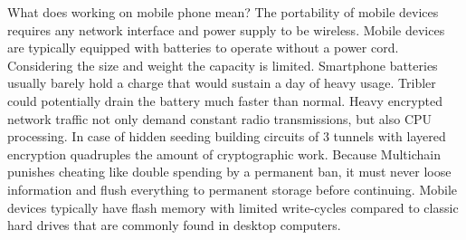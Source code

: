 What does working on mobile phone mean?
The portability of mobile devices requires any network interface and power supply to be wireless.
Mobile devices are typically equipped with batteries to operate without a power cord.
Considering the size and weight the capacity is limited.
Smartphone batteries usually barely hold a charge that would sustain a day of heavy usage.
Tribler could potentially drain the battery much faster than normal.
Heavy encrypted network traffic not only demand constant radio transmissions, but also CPU processing.
In case of hidden seeding building circuits of 3 tunnels with layered encryption quadruples  the amount of cryptographic work.
Because Multichain punishes cheating like double spending by a permanent ban, it must never loose information and flush everything to permanent storage before continuing.
Mobile devices typically have flash memory with limited write-cycles compared to classic hard drives that are commonly found in desktop computers.

